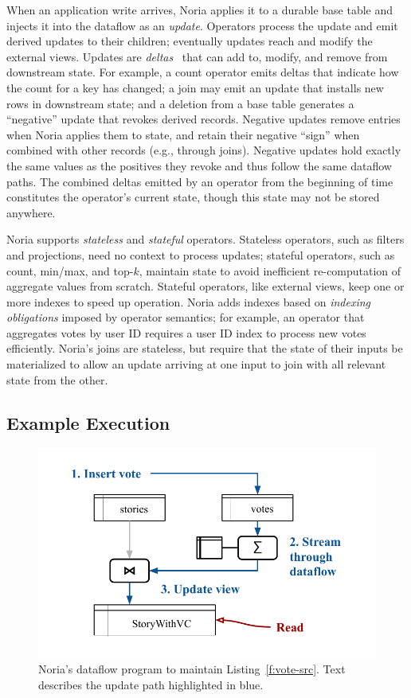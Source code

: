 When an application write arrives, Noria applies it to a durable base table and
injects it into the dataflow as an \emph{update}. Operators process the update
and emit derived updates to their children; eventually updates reach and modify
the external views. Updates are \emph{deltas}~\cite{roll, differential-dataflow}
that can add to, modify, and remove from downstream state. For example, a count
operator emits deltas that indicate how the count for a key has changed; a join
may emit an update that installs new rows in downstream state; and a deletion
from a base table generates a ``negative'' update that revokes derived records.
Negative updates remove entries when Noria applies them to state, and retain
their negative ``sign'' when combined with other records (e.g., through joins).
Negative updates hold exactly the same values as the positives they revoke and
thus follow the same dataflow paths. The combined deltas emitted by an operator
from the beginning of time constitutes the operator's current state, though this
state may not be stored anywhere.

Noria supports \emph{stateless} and \emph{stateful} operators. Stateless
operators, such as filters and projections, need no context to process updates;
stateful operators, such as count, min/max, and top-$k$, maintain state to avoid
inefficient re-computation of aggregate values from scratch. Stateful operators,
like external views, keep one or more indexes to speed up operation. Noria adds
indexes based on \emph{indexing obligations} imposed by operator semantics; for
example, an operator that aggregates votes by user ID requires a user ID index
to process new votes efficiently. Noria's joins are stateless, but require that
the state of their inputs be materialized to allow an update arriving at one
input to join with all relevant state from the other.

\subsection{Example Execution}

\begin{figure}[t]
  \centering
  \includegraphics{diagrams/Example Execution.pdf}
  \caption{Noria's dataflow program to maintain Listing~\ref{f:vote-src}. Text
  describes the update path highlighted in blue.}
  \label{f:example-exec}
\end{figure}

